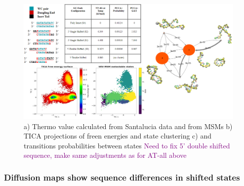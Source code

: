\documentclass[journal=jpcbfk,manuscript=article]{achemso}
\begin{document}
\begin{figure}[ht!]
	\begin{center}
        \includegraphics[width=\textwidth]{Figs/figs_0804/GC-end_in_one.PNG}
        \caption{a) Thermo value calculated from Santalucia data and from MSMs b) TICA projections of freen energies and state clustering c) and transitions probabilities between states \textcolor{Purple}{Need to fix 5' double shifted sequence, make same adjustments as for AT-all above}}
        \label{fig:GC-end_in_one}
	\end{center}
\end{figure}

\subsubsection{\label{sec:Results}Diffusion maps show sequence differences in shifted states}
\end{document}
